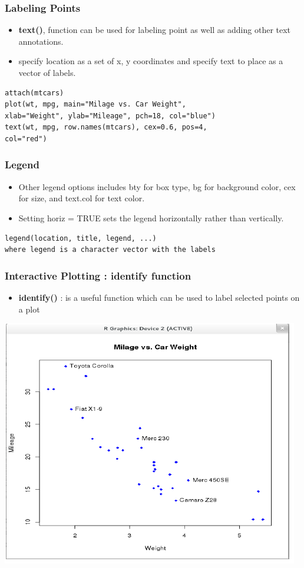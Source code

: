 \documentclass[12pt]{beamer}
\begin{document}
\begin{frame}[fragile]
\frametitle{Labeling Points}
\begin{itemize}
	\item \textbf{text()}, function can be used for labeling point as well as adding other
	text annotations.
	\item specify location as a set of x, y coordinates and specify text to place as
	a vector of labels.
\end{itemize}
\begin{verbatim}
attach(mtcars)
plot(wt, mpg, main="Milage vs. Car Weight",
xlab="Weight", ylab="Mileage", pch=18, col="blue")
text(wt, mpg, row.names(mtcars), cex=0.6, pos=4, 
col="red")
\end{verbatim}
\end{frame}


\begin{frame}[fragile]
\frametitle{Legend}
\begin{itemize}
	\item Other legend options includes bty for box type, bg for background color,
	cex for size, and text.col for text color.
		\item Setting horiz = TRUE sets the legend horizontally rather than vertically.
\end{itemize}
\begin{verbatim}
legend(location, title, legend, ...)
where legend is a character vector with the labels
\end{verbatim}
\end{frame}


\begin{frame}[fragile]
\frametitle{Interactive Plotting : identify function}
\begin{itemize}
	\item \textbf{identify()} : is a useful function which can be used to label selected points on a plot
\end{itemize}
\includegraphics[scale=0.5]{identify}
\end{frame}
\end{document}
